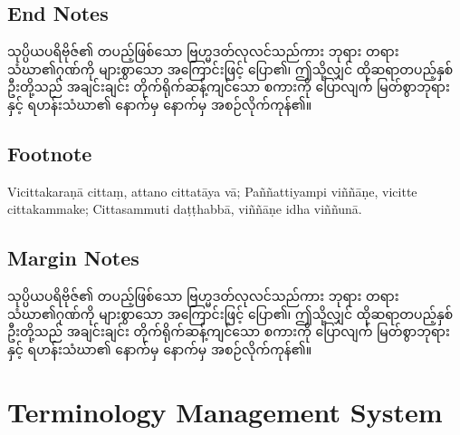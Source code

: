 \subsection{End Notes}
သုပ္ပိယပရိဗိုဇ်၏ တပည့်ဖြစ်သော ဗြဟ္မဒတ်လုလင်သည်ကား ဘုရား တရား သံဃာ၏ဂုဏ်ကို များစွာသော အကြောင်းဖြင့် ပြော၏၊ ဤသို့လျှင် ထိုဆရာတပည့်နှစ်ဦးတို့သည် အချင်းချင်း တိုက်ရိုက်ဆန့်ကျင်သော စကားကို ပြောလျက် မြတ်စွာဘုရားနှင့် ရဟန်းသံဃာ၏ နောက်မှ နောက်မှ အစဉ်လိုက်ကုန်၏။

\subsection{Footnote}
Vicittakaraṇā cittaṃ, attano cittatāya vā;
Paññattiyampi viññāṇe, vicitte cittakammake;
Cittasammuti daṭṭhabbā, viññāṇe idha viññunā.


\subsection{Margin Notes}
သုပ္ပိယပရိဗိုဇ်၏ တပည့်ဖြစ်သော ဗြဟ္မဒတ်လုလင်သည်ကား ဘုရား တရား သံဃာ၏ဂုဏ်ကို များစွာသော အကြောင်းဖြင့် ပြော၏၊ ဤသို့လျှင် ထိုဆရာတပည့်နှစ်ဦးတို့သည် အချင်းချင်း တိုက်ရိုက်ဆန့်ကျင်သော စကားကို ပြောလျက် မြတ်စွာဘုရားနှင့် ရဟန်းသံဃာ၏ နောက်မှ နောက်မှ အစဉ်လိုက်ကုန်၏။

\section{Terminology Management System}





\commentarytable
